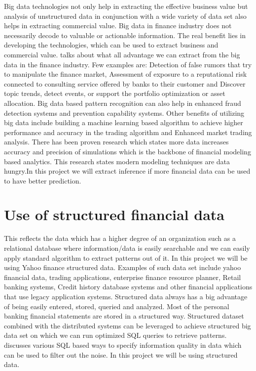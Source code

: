 \indent

Big data technologies not only help in extracting the effective business value but analysis of unstructured data in conjunction with a wide variety of data set 
also helps in extracting commercial value. Big data in finance industry does not necessarily decode to valuable or actionable information.
The real benefit lies in developing the technologies, which can be used to extract business and commercial value.  
\cite{Ref4}  talks about what all advantage we can extract from the big data in the finance industry. Few examples are: Detection of false rumors that try to
 manipulate the finance market, Assessment of exposure to a reputational risk connected to consulting service offered by banks to their customer and Discover 
 topic trends, detect events, or support the portfolio optimization or asset allocation.  Big data based pattern recognition can also help in enhanced fraud 
 detection systems and prevention capability systems. Other benefits of utilizing big data include building a machine learning based algorithm to achieve higher 
 performance and accuracy in the trading algorithm and Enhanced market trading analysis. There has been proven research \cite{Ref5} which states more data increases
 accuracy and precision of simulations which is the backbone of financial modeling based analytics. This research \cite{Ref5} states modern modeling techniques
 are data hungry.In this project we will extract inference if more financial data can be used to have better prediction.  


\section{Use of structured financial data}


This reflects the data which has a higher degree of an organization such as a relational database where information/data is easily searchable and we can easily 
apply standard algorithm to extract patterns out of it. In this project we will be using Yahoo finance structured data. Examples of such data set include
yahoo financial data, trading applications, enterprise finance resource planner, Retail banking 
systems, Credit history database systems and other financial applications that use legacy application systems. Structured data always has a big advantage of 
being easily entered, stored, queried and analyzed. Most of the personal banking financial statements are stored in a structured way.
 Structured dataset combined with the distributed systems can be leveraged to achieve structured big data set on which we can run optimized SQL queries to
 retrieve patterns. \cite{Ref6}  discusses various SQL based ways to specify information quality in data which can be used to filter out the noise. In this project 
 we will be using structured data. 

